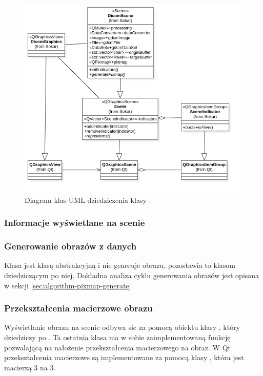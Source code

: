 \begin{figure}[!htbp]
    \centering
    \includegraphics[width=\textwidth]{img/uml/dicom-scene-layers.png}
    \caption{Diagram klas UML dziedziczenia klasy .}
    \label{uml:sokar-scene-layers}
\end{figure}


\subsubsection{Informacje wyświetlane na scenie}


\subsubsection{Generowanie obrazów z danych}

Klasa  jest klasą abstrakcyjną i nie generuje obrazu, pozostawia to klasom dziedziczącym po niej.
Dokładna analiza cyklu generowania obrazów jest opisana w sekcji \ref{sec:algorithm-pixmap-generate}.

\subsubsection{Przekształcenia macierzowe obrazu}

\par
Wyświetlanie obrazu na scenie odbywa sie za pomocą obiektu klasy , który dziedziczy po .
Ta ostatnia klasa ma w sobie zaimplementowaną funkcję pozwalającą na nałożenie przekształcenia macierzowego na obraz.
W Qt przekształcenia macierzowe są implementowane za pomocą klasy , która jest macierzą 3 na 3.

